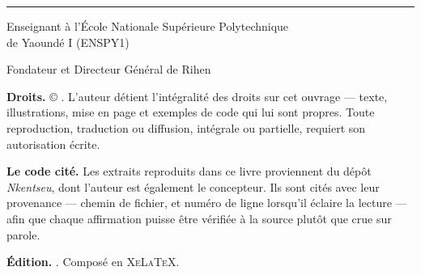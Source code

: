 %
\thispagestyle{empty}
\null\vfill

\begin{center}
{\sffamily\bfseries\large\color{rihenTeal}\DocTitre\par}
\vspace{4pt}
{\color{rihenOrange}\rule{3.2cm}{1.6pt}\par}
\end{center}

\vspace{18pt}

\begin{center}
{\sffamily\bfseries\color{grisTexte}\DocAuteur\par}
\vspace{9pt}
{\sffamily\small\color{grisTexte}
Enseignant à l'École Nationale Supérieure Polytechnique\\
de Yaoundé I (ENSPY1)\par}
\vspace{4pt}
{\sffamily\small\color{grisTexte}
Fondateur et Directeur Général de Rihen\par}
\end{center}

\vspace{26pt}

\begin{center}
\begin{minipage}{0.82\textwidth}
{\small
\textbf{Droits.} \copyright{} \DocAnnee{} \DocAuteur. L'auteur détient
l'intégralité des droits sur cet ouvrage --- texte, illustrations, mise en page
et exemples de code qui lui sont propres. Toute reproduction, traduction ou
diffusion, intégrale ou partielle, requiert son autorisation écrite.

\vspace{8pt}
\textbf{Le code cité.} Les extraits reproduits dans ce livre proviennent du
dépôt \emph{Nkentseu}, dont l'auteur est également le concepteur. Ils sont cités
avec leur provenance --- chemin de fichier, et numéro de ligne lorsqu'il éclaire
la lecture --- afin que chaque affirmation puisse être vérifiée à la source
plutôt que crue sur parole.

\vspace{8pt}
\textbf{Édition.} \DocDate. Composé en \textsc{XeLaTeX}.
\par}
\end{minipage}
\end{center}

